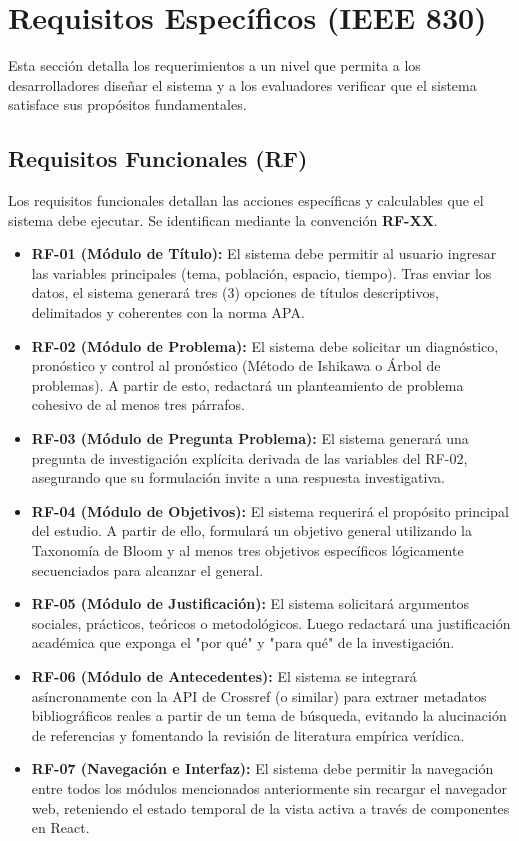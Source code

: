 \section{Requisitos Específicos (IEEE 830)}

Esta sección detalla los requerimientos a un nivel que permita a los desarrolladores diseñar el sistema y a los evaluadores verificar que el sistema satisface sus propósitos fundamentales.

\subsection{Requisitos Funcionales (RF)}
Los requisitos funcionales detallan las acciones específicas y calculables que el sistema debe ejecutar. Se identifican mediante la convención \textbf{RF-XX}.

\begin{itemize}
    \item \textbf{RF-01 (Módulo de Título):} El sistema debe permitir al usuario ingresar las variables principales (tema, población, espacio, tiempo). Tras enviar los datos, el sistema generará tres (3) opciones de títulos descriptivos, delimitados y coherentes con la norma APA.
    \item \textbf{RF-02 (Módulo de Problema):} El sistema debe solicitar un diagnóstico, pronóstico y control al pronóstico (Método de Ishikawa o Árbol de problemas). A partir de esto, redactará un planteamiento de problema cohesivo de al menos tres párrafos.
    \item \textbf{RF-03 (Módulo de Pregunta Problema):} El sistema generará una pregunta de investigación explícita derivada de las variables del RF-02, asegurando que su formulación invite a una respuesta investigativa.
    \item \textbf{RF-04 (Módulo de Objetivos):} El sistema requerirá el propósito principal del estudio. A partir de ello, formulará un objetivo general utilizando la Taxonomía de Bloom y al menos tres objetivos específicos lógicamente secuenciados para alcanzar el general.
    \item \textbf{RF-05 (Módulo de Justificación):} El sistema solicitará argumentos sociales, prácticos, teóricos o metodológicos. Luego redactará una justificación académica que exponga el "por qué" y "para qué" de la investigación.
    \item \textbf{RF-06 (Módulo de Antecedentes):} El sistema se integrará asíncronamente con la API de Crossref (o similar) para extraer metadatos bibliográficos reales a partir de un tema de búsqueda, evitando la alucinación de referencias y fomentando la revisión de literatura empírica verídica.
    \item \textbf{RF-07 (Navegación e Interfaz):} El sistema debe permitir la navegación entre todos los módulos mencionados anteriormente sin recargar el navegador web, reteniendo el estado temporal de la vista activa a través de componentes en React.
\end{itemize}

